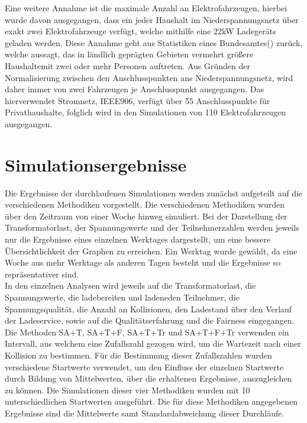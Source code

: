 Eine weitere Annahme ist die maximale Anzahl an Elektrofahrzeugen, hierbei wurde davon ausgegangen, dass ein jeder Haushalt im Niederspannungsnetz über exakt zwei Elektrofahrzeuge verfügt, welche mithilfe eine 22kW Ladegeräts geladen werden. Diese Annahme geht aus Statistiken eines Bundesamtes(\cite{hochstetter_2015}) zurück, welche aussagt, das in ländlich geprägten Gebieten vermehrt größere Haushaltemit zwei oder mehr Personen auftreten. Aus Gründen der Normalisierung zwischen den Anschlusspunkten ans Niederspannungsnetz, wird daher immer von zwei Fahrzeugen je Anschlusspunkt ausgegangen. Das hierverwendet Stromnetz, IEEE906, verfügt über 55 Anschlusspunkte für Privathaushalte, folglich wird in den Simulationen von 110 Elektrofahrzeugen ausgegangen.\\

\section{Simulationsergebnisse}
Die Ergebnisse der durchlaufenen Simulationen werden zunächst aufgeteilt auf die verschiedenen Methodiken vorgestellt. Die verschiedenen Methodiken wurden über den Zeitraum von einer Woche hinweg simuliert. Bei der Darstellung der Transformatorlast, der Spannungswerte und der Teilnehmerzahlen werden jeweils nur die Ergebnisse eines einzelnen Werktages dargestellt, um eine bessere Übersichtlichkeit der Graphen zu erreichen. Ein Werktag wurde gewählt, da eine Woche aus mehr Werktage als anderen Tagen besteht und die Ergebnisse so repräsentativer sind. \\
In den einzelnen Analysen wird jeweils auf die Transformatorlast, die Spannungswerte, die ladebereiten und ladeneden Teilnehmer, die Spannungsqualität, die Anzahl an Kollisionen, den Ladestand über den Verlauf der Ladeservice, sowie auf die Qualitätserfahrung und die Fairness eingegangen. Die Methoden SA+T, SA+T+F, SA+T+Tr und SA+T+F+Tr verwenden ein Intervall, aus welchem eine Zufallszahl gezogen wird, um die Wartezeit nach einer Kollision zu bestimmen. Für die Bestimmung dieser Zufallszahlen wurden verschiedene Startwerte verwendet, um den Einfluss der einzelnen Startwerte durch Bildung von Mittelwerten, über die erhaltenen Ergebnisse, auszugleichen zu können. Die Simulationen dieser vier Methodiken wurden mit 10 unterschiedlichen Startwerten ausgeführt. Die für diese Methodiken angegebenen Ergebnisse sind die Mittelwerte samt Standardabweichung dieser Durchläufe.
